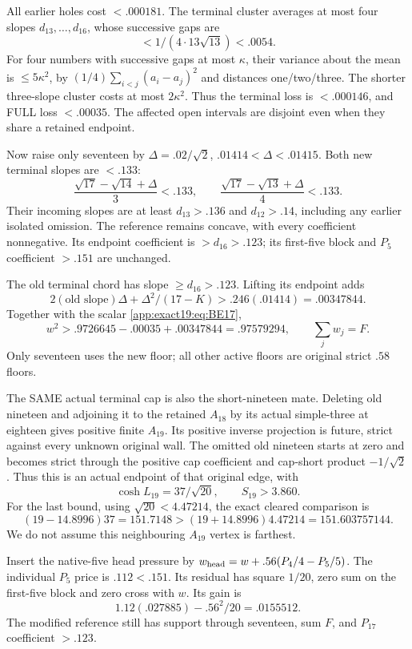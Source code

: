 \documentclass[11pt]{article}
\theoremstyle{definition}
\theoremstyle{remark}
\begin{document}
All earlier holes cost \(<.000181\).
The terminal cluster averages
at most four slopes
\(d_{13},\ldots,d_{16}\), whose
successive gaps are
\[
                         <1/(4\cdot13\sqrt{13})<.0054 .
\]
For four numbers with successive
gaps at most \(\kappa\), their
variance about the mean is
\(\le5\kappa^2\), by
\((1/4)\sum_{i<j}(a_i-a_j)^2\)
and distances one/two/three.
The shorter three-slope cluster
costs at most \(2\kappa^2\).
Thus the terminal loss is
\(<.000146\), and FULL loss
\(<.00035\).
The affected open intervals
are disjoint even when they
share a retained endpoint.

Now raise only seventeen by
\(\Delta=.02/\sqrt2\),
\(.01414<\Delta<.01415\).
Both new terminal slopes are
\(<.133\):
\[
 \frac{\sqrt{17}-\sqrt{14}+\Delta}{3}<.133,\qquad
 \frac{\sqrt{17}-\sqrt{13}+\Delta}{4}<.133 .
\]
Their incoming slopes are at
least \(d_{13}>.136\) and
\(d_{12}>.14\), including any
earlier isolated omission.
The reference remains concave,
with every coefficient nonnegative.
Its endpoint coefficient is
\(>d_{16}>.123\); its first-five
block and \(P_5\) coefficient
\(>.151\) are unchanged.

The old terminal chord has slope
\(\ge d_{16}>.123\).
Lifting its endpoint adds
\[
                  2(\text{old slope})\Delta+
                         \Delta^2/(17-K)>.246(.01414)=.00347844 .
\]
Together with the scalar
\eqref{app:exact19:eq:BE17},
\[
             w^2>.9726645-.00035+.00347844=.97579294,
                       \qquad\sum_jw_j=F .
\]
Only seventeen uses the new floor;
all other active floors are
original strict \(.58\) floors.

The SAME actual terminal cap is
also the short-nineteen mate.
Deleting old nineteen and adjoining
it to the retained \(A_{18}\) by
its actual simple-three at eighteen
gives positive finite \(A_{19}\).
Its positive inverse projection
is future, strict against every
unknown original wall.
The omitted old nineteen starts
at zero and becomes strict through
the positive cap coefficient and
cap-short product \(-1/\sqrt2\).
Thus this is an actual endpoint
of that original edge, with
\[
                    \cosh L_{19}=37/\sqrt{20},\qquad S_{19}>3.860 .
\]
For the last bound, using
\(\sqrt{20}<4.47214\), the exact
cleared comparison is
\[
 (19-14.8996)37=151.7148
              >(19+14.8996)4.47214=151.603757144 .
\]
We do not assume this neighbouring
\(A_{19}\) vertex is farthest.

Insert the native-five head
pressure by
\(w_{\rm head}=w+.56(P_4/4-P_5/5)\).
The individual \(P_5\) price
is \(.112<.151\).
Its residual has square \(1/20\),
zero sum on the first-five block
and zero cross with \(w\).
Its gain is
\[
                         1.12(.027885)-.56^2/20=.0155512 .
\]
The modified reference still has
support through seventeen, sum
\(F\), and \(P_{17}\) coefficient
\(>.123\).
\end{document}

